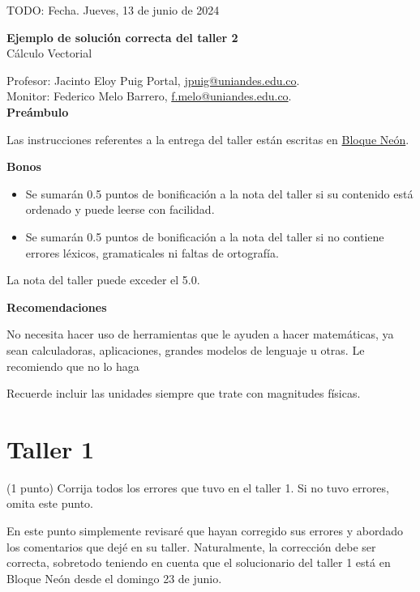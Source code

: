 \documentclass{fmbvecto}
\renewcommand{\title}{Ejemplo de solución correcta del taller 2}
\newcommand{\subject}{Cálculo Vectorial}
\begin{document}
TODO: Fecha. Jueves, 13 de junio de 2024

\begin{center}
    \textbf{\LARGE \title} \\
    {\large \subject}
\end{center}


Profesor: Jacinto Eloy Puig Portal, \href{mailto:jpuig@uniandes.edu.co}{jpuig@uniandes.edu.co}. \\
Monitor: Federico Melo Barrero, \href{mailto:f.melo@uniandes.edu.co}{f.melo@uniandes.edu.co}.\\

\textbf{\Large Preámbulo}

Las instrucciones referentes a la entrega del taller están escritas en \href{https://bloqueneon.uniandes.edu.co/d2l/home}{Bloque Neón}.

\textbf{Bonos}
\begin{itemize}
  \item Se sumarán 0.5 puntos de bonificación a la nota del taller si su contenido está ordenado y puede leerse con facilidad.
  \item Se sumarán 0.5 puntos de bonificación a la nota del taller si no contiene errores léxicos, gramaticales ni faltas de ortografía.
\end{itemize}
La nota del taller puede exceder el 5.0.

\textbf{Recomendaciones}

No necesita hacer uso de herramientas que le ayuden a hacer matemáticas, ya sean calculadoras, aplicaciones, grandes modelos de lenguaje u otras. Le recomiendo que no lo haga

Recuerde incluir las unidades siempre que trate con magnitudes físicas.

\section{Taller 1}

\begin{problema}
    
    (1 punto) Corrija todos los errores que tuvo en el taller 1. Si no tuvo errores, omita este punto.
    
    En este punto simplemente revisaré que hayan corregido sus errores y abordado los comentarios que dejé en su taller. Naturalmente, la corrección debe ser correcta, sobretodo teniendo en cuenta que el solucionario del taller 1 está en Bloque Neón desde el domingo 23 de junio.

\end{problema}
\end{document}
